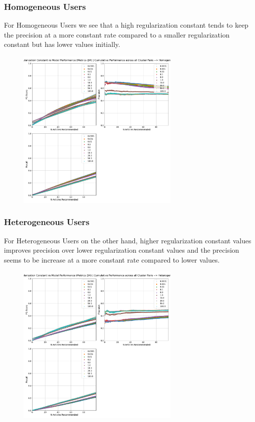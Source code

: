 \documentclass[a4paper,fontsize=8.0pt]{scrartcl}
\begin{document}
\subsubsection{Homogeneous Users}
\begin{flushleft}
For Homogeneous Users we see that a high regularization constant tends to keep the precision at a more constant rate compared to a smaller regularization constant but has lower values initially.
\end{flushleft}
\vspace{-1ex}
\begin{figure}[H]
 \includegraphics[width=0.7\textwidth]{Graphs/GLOVE/regularization_vs_model_performance_cumu_Homogeneous.pdf}
\end{figure}
\vspace{-3ex}
\subsubsection{Heterogeneous Users}
\begin{flushleft}
For Heterogeneous Users on the other hand, higher regularization constant values improves precision over lower regularization constant values and the precision seems to be increase at a more constant rate compared to lower values.
\end{flushleft}
\vspace{-1ex}
\begin{figure}[H]
 \includegraphics[width=0.7\textwidth]{Graphs/GLOVE/regularization_vs_model_performance_cumu_Heterogeneous.pdf}
\end{figure}
\end{document}
